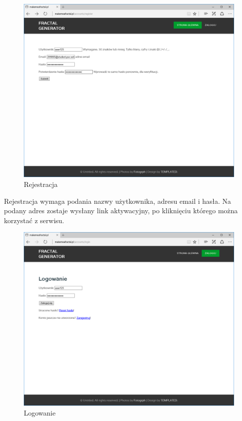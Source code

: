 \documentclass[a4paper]{article}
\begin{document}
\begin{figure}[H]
    \centering
    \includegraphics[width=\textwidth]{register_page.png}
    \caption{Rejestracja}
    \label{fig:reg_page}
\end{figure}
Rejestracja wymaga podania nazwy użytkownika, adresu email i hasła. Na podany adres zostaje wysłany link aktywacyjny, po kliknięciu którego można korzystać z serwisu.
\begin{figure}[H]
    \centering
    \includegraphics[width=\textwidth]{login_page.png}
    \caption{Logowanie}
    \label{fig:activ_page}
\end{figure}
\end{document}

